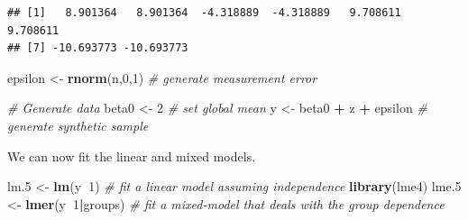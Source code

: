 \documentclass[]{book}
\newenvironment{Shaded}{\begin{snugshade}}{\end{snugshade}}
\newcommand{\CommentTok}[1]{\textcolor[rgb]{0.56,0.35,0.01}{\textit{#1}}}
\newcommand{\DataTypeTok}[1]{\textcolor[rgb]{0.13,0.29,0.53}{#1}}
\newcommand{\DecValTok}[1]{\textcolor[rgb]{0.00,0.00,0.81}{#1}}
\newcommand{\FloatTok}[1]{\textcolor[rgb]{0.00,0.00,0.81}{#1}}
\newcommand{\KeywordTok}[1]{\textcolor[rgb]{0.13,0.29,0.53}{\textbf{#1}}}
\newcommand{\NormalTok}[1]{#1}
\newcommand{\OperatorTok}[1]{\textcolor[rgb]{0.81,0.36,0.00}{\textbf{#1}}}
\newcommand{\StringTok}[1]{\textcolor[rgb]{0.31,0.60,0.02}{#1}}
\theoremstyle{definition}
\theoremstyle{definition}
\theoremstyle{definition}
\theoremstyle{remark}
\begin{document}
\begin{Shaded}
\end{Shaded}

\begin{verbatim}
## [1]   8.901364   8.901364  -4.318889  -4.318889   9.708611   9.708611
## [7] -10.693773 -10.693773
\end{verbatim}

\begin{Shaded}
\begin{Highlighting}[]
\NormalTok{epsilon <-}\StringTok{ }\KeywordTok{rnorm}\NormalTok{(n,}\DecValTok{0}\NormalTok{,}\DecValTok{1}\NormalTok{) }\CommentTok{# generate measurement error}

\CommentTok{# Generate data}
\NormalTok{beta0 <-}\StringTok{ }\DecValTok{2} \CommentTok{# set global mean}
\NormalTok{y <-}\StringTok{ }\NormalTok{beta0 }\OperatorTok{+}\StringTok{ }\NormalTok{z }\OperatorTok{+}\StringTok{ }\NormalTok{epsilon }\CommentTok{# generate synthetic sample}
\end{Highlighting}
\end{Shaded}

We can now fit the linear and mixed models.

\begin{Shaded}
\begin{Highlighting}[]
\NormalTok{lm}\FloatTok{.5}\NormalTok{ <-}\StringTok{ }\KeywordTok{lm}\NormalTok{(y}\OperatorTok{~}\DecValTok{1}\NormalTok{)  }\CommentTok{# fit a linear model assuming independence}
\KeywordTok{library}\NormalTok{(lme4)}
\NormalTok{lme}\FloatTok{.5}\NormalTok{ <-}\StringTok{ }\KeywordTok{lmer}\NormalTok{(y}\OperatorTok{~}\DecValTok{1}\OperatorTok{|}\NormalTok{groups) }\CommentTok{# fit a mixed-model that deals with the group dependence}
\end{Highlighting}
\end{Shaded}
\end{document}

